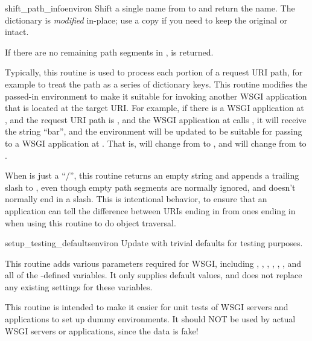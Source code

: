 \begin{funcdesc}{shift_path_info}{environ}
Shift a single name from  to  and
return the name.  The  dictionary is \emph{modified}
in-place; use a copy if you need to keep the original 
or  intact.

If there are no remaining path segments in , 
is returned.

Typically, this routine is used to process each portion of a request
URI path, for example to treat the path as a series of dictionary keys.
This routine modifies the passed-in environment to make it suitable for
invoking another WSGI application that is located at the target URI.
For example, if there is a WSGI application at , and the
request URI path is , and the WSGI application at
 calls , it will receive the string
``bar'', and the environment will be updated to be suitable for passing
to a WSGI application at .  That is, 
will change from  to , and 
will change from  to .

When  is just a ``/'', this routine returns an empty
string and appends a trailing slash to , even though
empty path segments are normally ignored, and  doesn't
normally end in a slash.  This is intentional behavior, to ensure that
an application can tell the difference between URIs ending in 
from ones ending in  when using this routine to do object
traversal.

\end{funcdesc}

\begin{funcdesc}{setup_testing_defaults}{environ}
Update  with trivial defaults for testing purposes.

This routine adds various parameters required for WSGI, including
, , ,
, , , and all of
the -defined  variables.  It only supplies default
values, and does not replace any existing settings for these variables.

This routine is intended to make it easier for unit tests of WSGI
servers and applications to set up dummy environments.  It should NOT
be used by actual WSGI servers or applications, since the data is fake!
\end{funcdesc}



